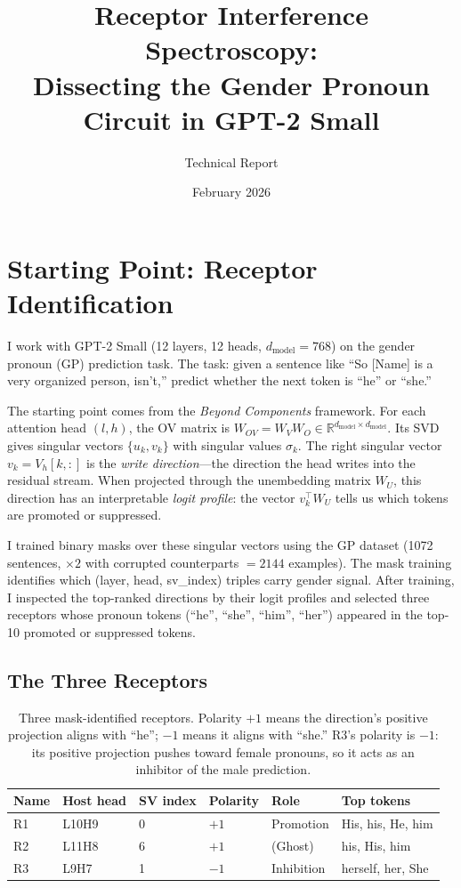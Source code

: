 \documentclass[11pt,a4paper]{article}
\title{Receptor Interference Spectroscopy:\\Dissecting the Gender Pronoun Circuit in GPT-2 Small}
\author{Technical Report}
\date{February 2026}
\begin{document}
\maketitle
\tableofcontents
\newpage

\section{Starting Point: Receptor Identification}
\label{sec:setup}

I work with GPT-2 Small (12 layers, 12 heads, $d_\text{model}=768$) on the gender pronoun (GP) prediction task. The task: given a sentence like ``So [Name] is a very organized person, isn't,'' predict whether the next token is ``he'' or ``she.''

The starting point comes from the \emph{Beyond Components} framework. For each attention head $(l,h)$, the OV matrix is $W_{OV} = W_V W_O \in \mathbb{R}^{d_\text{model}\times d_\text{model}}$. Its SVD gives singular vectors $\{u_k, v_k\}$ with singular values $\sigma_k$. The right singular vector $v_k = V_h[k,:]$ is the \emph{write direction}---the direction the head writes into the residual stream. When projected through the unembedding matrix $W_U$, this direction has an interpretable \emph{logit profile}: the vector $v_k^\top W_U$ tells us which tokens are promoted or suppressed.

I trained binary masks over these singular vectors using the GP dataset (1072 sentences, $\times 2$ with corrupted counterparts $= 2144$ examples). The mask training identifies which (layer, head, sv\_index) triples carry gender signal. After training, I inspected the top-ranked directions by their logit profiles and selected three receptors whose pronoun tokens (``he'', ``she'', ``him'', ``her'') appeared in the top-10 promoted or suppressed tokens.

\subsection{The Three Receptors}

\begin{table}[H]
\centering
\begin{tabular}{llllll}
\toprule
Name & Host head & SV index & Polarity & Role & Top tokens \\
\midrule
R1 & L10H9 & 0 & $+1$ & Promotion & His, his, He, him \\
R2 & L11H8 & 6 & $+1$ & (Ghost) & his, His, him \\
R3 & L9H7  & 1 & $-1$ & Inhibition & herself, her, She \\
\bottomrule
\end{tabular}
\caption{Three mask-identified receptors. Polarity $+1$ means the direction's positive projection aligns with ``he''; $-1$ means it aligns with ``she.'' R3's polarity is $-1$: its positive projection pushes toward female pronouns, so it acts as an inhibitor of the male prediction.}
\label{tab:receptors}
\end{table}
\end{document}
